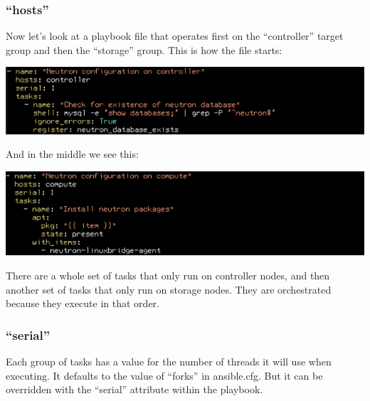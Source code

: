 \documentclass[helvetica,english,utf8,notitle,nologo]{beamer}
\begin{document}
\begin{frame}
  \frametitle{``hosts''}

  Now let's look at a playbook file that operates first on the
  ``controller'' target group and then the ``storage'' group. This is
  how the file starts:

  \includegraphics[scale=0.44]{img_26}

  And in the middle we see this:

  \includegraphics[scale=0.44]{img_27}

There are a whole set of tasks that only run on controller nodes, and
then another set of tasks that only run on storage nodes. They are
orchestrated because they execute in that order.
\end{frame}

\begin{frame}
  \frametitle{``serial''}

  Each group of tasks has a value for the number of threads it will use
  when executing. It defaults to the value of ``forks'' in
  ansible.cfg. But it can be overridden with the ``serial'' attribute
  within the playbook.
\end{frame}
\end{document}
